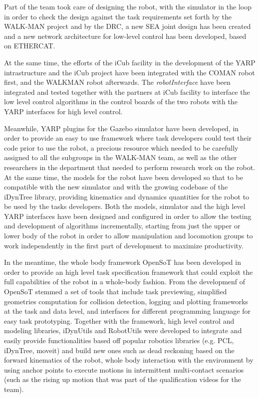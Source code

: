 \documentclass[%
	paper=A4,					%
	twoside=true,				%
	openright,			.
	parskip=full,				%
	chapterprefix=true,			%
	11pt,						%
	headings=normal,			%
	bibliography=totoc,			%
	listof=totoc,				%
	titlepage=on,				%
	captions=tableabove,		%
	draft=true,				%
]{scrreprt}%
\begin{document}
Part of the team took care of designing the robot, with the simulator in the loop in order to check the design against the task requirements set forth by the WALK-MAN project and by the DRC, a new SEA joint design has been created and a new network architecture for low-level control has been developed, based on ETHERCAT. 

At the same time, the efforts of the iCub facility in the development of the YARP intrastructure and the iCub project have been integrated with the COMAN robot first, and the WALKMAN robot afterwards. The \emph{robotInterface} have been integrated and tested together with the partners at iCub facility to interface the low level control algorithms in the control boards of the two robots with the YARP interfaces for high level control. 

Meanwhile, YARP plugins for the Gazebo simulator have been developed, in order to provide an easy to use framework where task developers could test their code prior to use the robot, a precious resource which needed to be carefully assigned to all the subgroups in the WALK-MAN team, as well as the other researchers in the department that needed to perform research work on the robot. At the same time, the models for the robot have been developed so that to be compatible with the new simulator and with the growing codebase of the iDynTree library, providing kinematics and dynamics quantities for the robot to be used by the tasks developers. Both the models, simulator and the high level YARP interfaces have been designed and configured in order to allow the testing and development of algorithms incrementally, starting from just the upper or lower body of the robot in order to allow manipulation and locomotion groups to work independently in the first part of development to maximize productivity. 

In the meantime, the whole body framework OpenSoT has been developed in order to provide an high level task specification framework that could exploit the full capabilities of the robot in a whole-body fashion. From the developmenf of OpenSoT stemmed a set of tools that include task previewing, simplified geometries computation for collision detection, logging and plotting frameworks at the task and data level, and interfaces for different programming language for easy task prototyping. Together with the framework, high level control and modeling libraries, iDynUtils and RobotUtils were developed to integrate and easily provide functionalities based off popular robotics libraries (e.g. PCL, iDynTree, moveit) and build new ones such as dead reckoning based on the forward kinematics of the robot, whole body interaction with the environment by using anchor points to execute motions in intermittent multi-contact scenarios (such as the rising up motion that was part of the qualification videos for the team). 
\end{document}
